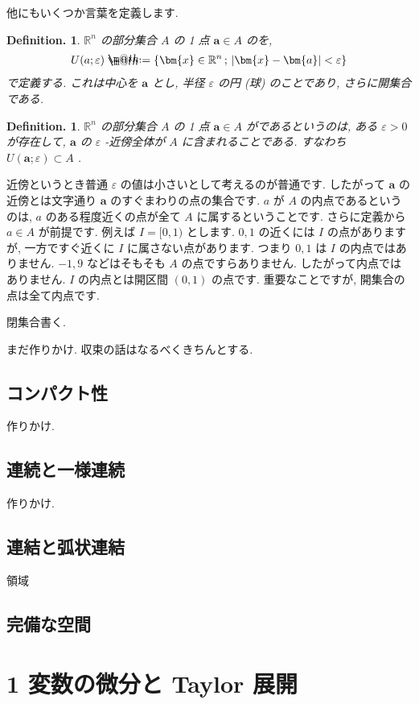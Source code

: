 \documentclass[openany, a4paper, oneside]{book}
\makeatletter
\newcommand*{\defeq}{\mathrel{\rlap{%
\raisebox{0.3ex}{$\m@th\cdot$}}%
\raisebox{-0.3ex}{$\m@th\cdot$}}%
=}
\theoremstyle{break}
\theoremstyle{breakdefn}
\newtheorem{defn}[thm]{Definition.}
\newcommand{\bbR}{\mathbb{R}}
\newcommand{\vep}{\varepsilon}
\makeatother
\begin{document}
他にもいくつか言葉を定義します.
\begin{defn}
 $\bbR^n$ の部分集合 $A$ の 1 点 $\bm{a}\in A$ の\textgt{ $\vep$ -近傍}\index{いぷしろんきんぼう@ $\vep$ -近傍}を,
    \begin{align}
        U ( a ; \vep )
        \defeq
        \{ \bm{x} \in \bbR^n \, ; \, |\bm{x} - \bm{a}| < \vep \}
    \end{align}
で定義する. これは中心を $\bm{a}$ とし, 半径 $\vep$ の円 (球) のことであり, さらに開集合である.
\end{defn}
\begin{defn}
 $\bbR^n$ の部分集合 $A$ の 1 点 $\bm{a}\in A$ がであるというのは,
ある $\vep>0$ が存在して,  $\bm{a}$ の $\vep$ -近傍全体が $A$ に含まれることである.
すなわち $U (\bm{a};\vep) \subset A$ .
\end{defn}
近傍というとき普通 $\vep$ の値は小さいとして考えるのが普通です.
したがって $\bm{a}$ の近傍とは文字通り $\bm{a}$ のすぐまわりの点の集合です.
 $a$ が $A$ の内点であるというのは,  $a$ のある程度近くの点が全て $A$ に属するということです.
さらに定義から $a \in A$ が前提です.
例えば $I=[0,1)$ とします.
 $0,1$ の近くには $I$ の点がありますが, 一方ですぐ近くに $I$ に属さない点があります.
つまり $0,1$ は $I$ の内点ではありません.
 $-1,9$ などはそもそも $A$ の点ですらありません.
したがって内点ではありません.
 $I$ の内点とは開区間 $(0,1)$ の点です.
重要なことですが, 開集合の点は全て内点です.

閉集合書く.

まだ作りかけ. 収束の話はなるべくきちんとする.
\subsection{コンパクト性}
\label{sec-5-2-2-5}

作りかけ.
\subsection{連続と一様連続}
\label{sec-5-2-2-6}

作りかけ.
\subsection{連結と弧状連結}
\label{sec-5-2-2-7}

領域
\subsection{完備な空間}
\label{sec-5-2-2-8}
\section{1 変数の微分と Taylor 展開}
\label{sec-5-2-3}
\end{document}

